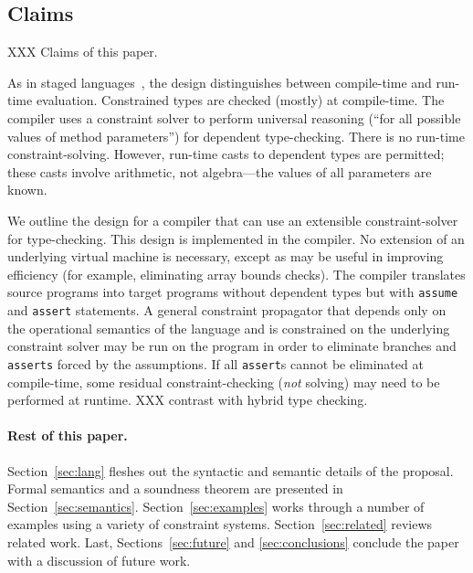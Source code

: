 \subsection{Claims}

XXX Claims of this paper.

%
%

As in staged languages~\cite{nielson-multistage,ts97-multistage},
the design distinguishes between
compile-time and run-time evaluation. Constrained types are
checked (mostly) at compile-time.
The compiler uses a
constraint solver to perform universal reasoning (``for all possible
values of method parameters'') for dependent type-checking.  There is
no run-time constraint-solving.  However,
run-time casts to dependent types are
permitted; these casts involve arithmetic, not
algebra---the values of all parameters are known.

We outline the design for a compiler that can use an extensible
constraint-solver for type-checking.
This design is implemented in the \Xten{} compiler.
No extension of an
underlying virtual machine is necessary, except as may be useful in
improving efficiency (for example, eliminating array bounds checks).
The compiler translates source
programs into target programs without dependent types
but with {\tt assume} and {\tt assert} statements.
A general
constraint propagator that depends only on the operational semantics
of the language and is constrained on the underlying constraint solver
may be run on the program in order to eliminate branches and {\tt
asserts} forced by the assumptions. If all {\tt assert}s cannot be
eliminated at compile-time, some residual constraint-checking
({\em not} solving) may need to be performed at runtime.
%
XXX contrast with hybrid type checking.

\paragraph{Rest of this paper.}

Section~\ref{sec:lang} fleshes out the syntactic and semantic details of the
proposal.
Formal semantics
and a soundness theorem
are presented in Section~\ref{sec:semantics}.
Section~\ref{sec:examples} works through a number of
examples using a variety of constraint systems.
Section~\ref{sec:related} reviews related work.
Last, Sections~\ref{sec:future}
and \ref{sec:conclusions} conclude the paper with a discussion of
future work.

